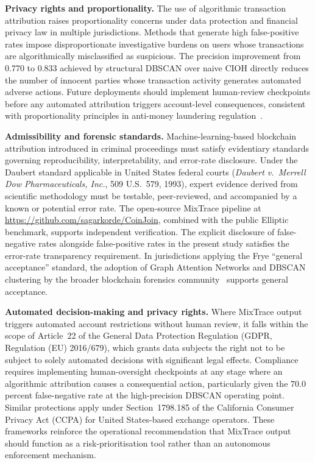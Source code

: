\documentclass[12pt,a4paper]{article}
\begin{document}
\textbf{Privacy rights and proportionality.}
The use of algorithmic transaction attribution raises
proportionality concerns under data protection and
financial privacy law in multiple jurisdictions. Methods
that generate high false-positive rates impose
disproportionate investigative burdens on users whose
transactions are algorithmically misclassified as
suspicious. The precision improvement from 0.770 to
0.833 achieved by structural DBSCAN over naive CIOH
directly reduces the number of innocent parties whose
transaction activity generates automated adverse actions.
Future deployments should implement human-review
checkpoints before any automated attribution triggers
account-level consequences, consistent with
proportionality principles in anti-money laundering
regulation~\citep{coinjoin2024tdsc}.

\textbf{Admissibility and forensic standards.}
Machine-learning-based blockchain attribution introduced
in criminal proceedings must satisfy evidentiary standards
governing reproducibility, interpretability, and error-rate
disclosure. Under the Daubert standard applicable in
United States federal courts (\textit{Daubert v.\ Merrell
Dow Pharmaceuticals, Inc.}, 509 U.S.\ 579, 1993), expert
evidence derived from scientific methodology must be
testable, peer-reviewed, and accompanied by a known or
potential error rate. The open-source MixTrace pipeline at
\url{https://github.com/sagarkorde/CoinJoin}, combined with
the public Elliptic benchmark, supports independent
verification. The explicit disclosure of false-negative
rates alongside false-positive rates in the present study
satisfies the error-rate transparency requirement. In
jurisdictions applying the Frye ``general acceptance''
standard, the adoption of Graph Attention Networks and
DBSCAN clustering by the broader blockchain forensics
community~\citep{motie2024,futureinternet2025} supports
general acceptance.

\textbf{Automated decision-making and privacy rights.}
Where MixTrace output triggers automated account
restrictions without human review, it falls within the
scope of Article~22 of the General Data Protection
Regulation (GDPR, Regulation (EU) 2016/679), which
grants data subjects the right not to be subject to
solely automated decisions with significant legal effects.
Compliance requires implementing human-oversight
checkpoints at any stage where an algorithmic attribution
causes a consequential action, particularly given the
70.0 percent false-negative rate at the high-precision
DBSCAN operating point. Similar protections apply under
Section~1798.185 of the California Consumer Privacy Act
(CCPA) for United States-based exchange operators. These
frameworks reinforce the operational recommendation that
MixTrace output should function as a risk-prioritisation
tool rather than an autonomous enforcement mechanism.
\end{document}
